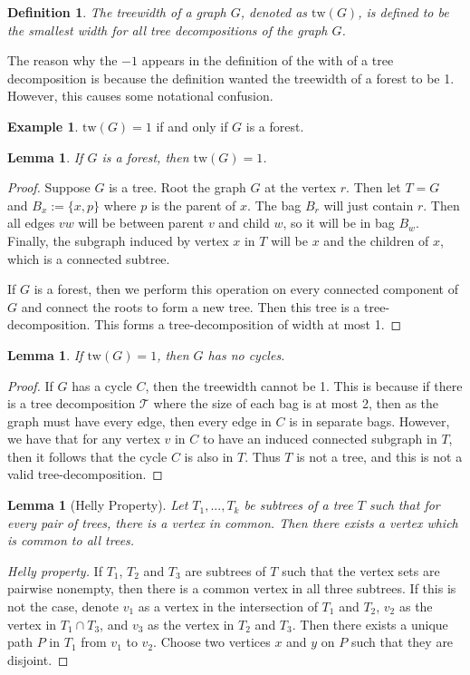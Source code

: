 \documentclass[]{article}
\newcommand{\tree}{\mathcal{T}}
\newcommand{\tw}{\text{tw}}
\newtheorem{lemma}[theorem]{Lemma}
\newtheorem{definition}[theorem]{Definition}
\theoremstyle{definition}
\newtheorem{example}[theorem]{Example}
\numberwithin{theorem}{section}
\numberwithin{equation}{section}
\begin{document}
\begin{definition}
	The treewidth of a graph $G$, denoted as $\tw(G)$, is defined to be the smallest width for all tree decompositions of the graph $G$.
\end{definition}
The reason why the $-1$ appears in the definition of the with of a tree decomposition is because the definition wanted the treewidth of a forest to be 1. However, this causes some notational confusion.
\begin{example}
	$\tw(G) = 1$ if and only if $G$ is a forest.
	\begin{lemma}
		If $G$ is a forest, then $\tw(G) = 1$.
	\end{lemma}
	\begin{proof}
		Suppose $G$ is a tree. Root the graph $G$ at the vertex $r$. Then let $T = G$ and $B_x:= \lbrace x, p \rbrace$ where $p$ is the parent of $x$. The bag $B_r$ will just contain $r$. Then all edges $vw$ will be between parent $v$ and child $w$, so it will be in bag $B_w$. Finally, the subgraph induced by vertex $x$ in $T$ will be $x$ and the children of $x$, which is a connected subtree.
		
		If $G$ is a forest, then we perform this operation on every connected component of $G$ and connect the roots to form a new tree. Then this tree is a tree-decomposition. This forms a tree-decomposition of width at most 1. 
	\end{proof}
	\begin{lemma}
		If $\tw(G) = 1$, then $G$ has no cycles.
	\end{lemma}
	\begin{proof}
		If $G$ has a cycle $C$, then the treewidth cannot be 1. This is because if there is a tree decomposition $\tree$ where the size of each bag is at most 2, then as the graph must have every edge, then every edge in $C$ is in separate bags. However, we have that for any vertex $v$ in $C$ to have an induced connected subgraph in $T$, then it follows that the cycle $C$ is also in $T$. Thus $T$ is not a tree, and this is not a valid tree-decomposition. 
	\end{proof}
\end{example}
\begin{lemma}[Helly Property]
	Let $T_1, ..., T_k$ be subtrees of a tree $T$ such that for every pair of trees, there is a vertex in common. Then there exists a vertex which is common to all trees.
\end{lemma}
\begin{proof}[Helly property]
	If $T_1$, $T_2$ and $T_3$ are subtrees of $T$ such that the vertex sets are pairwise nonempty, then there is a common vertex in all three subtrees. If this is not the case, denote $v_1$ as a vertex in the intersection of $T_1$ and $T_2$, $v_2$ as the vertex in $T_1 \cap T_3$, and $v_3$ as the vertex in $T_2$ and $T_3$. Then there exists a unique path $P$ in $T_1$ from $v_1$ to $v_2$. Choose two vertices $x$ and $y$ on $P$ such that they are disjoint.
\end{proof}
\end{document}

